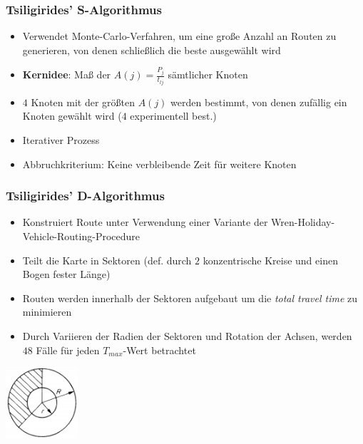 \documentclass{beamer}
\begin{document}
\begin{frame}
  \frametitle{Tsiligirides' S-Algorithmus}
  \begin{itemize}
    \item Verwendet Monte-Carlo-Verfahren, um eine große Anzahl an Routen zu generieren,
    von denen schließlich die beste ausgewählt wird
    \item \textbf{Kernidee}: Maß der  $A(j) = \frac{P_j}{t_{lj}}$ sämtlicher Knoten
    \item $4$ Knoten mit der größten $A(j)$ werden bestimmt, von denen zufällig ein Knoten gewählt wird ($4$ experimentell best.)
    \item Iterativer Prozess
    \item Abbruchkriterium: Keine verbleibende Zeit für weitere Knoten
  \end{itemize}
\end{frame}

\begin{frame}
  \frametitle{Tsiligirides' D-Algorithmus}
  \begin{itemize}
    \item Konstruiert Route unter Verwendung einer Variante der Wren-Holiday-Vehicle-Routing-Procedure
    \item Teilt die Karte in Sektoren (def. durch $2$ konzentrische Kreise und einen Bogen fester Länge)
    \item Routen werden innerhalb der Sektoren aufgebaut um die \textit{total travel time} zu minimieren
    \item Durch Variieren der Radien der Sektoren und Rotation der Achsen, werden $48$ Fälle für jeden $T_{max}$-Wert betrachtet
  \end{itemize}
  \includegraphics[width=0.2\textwidth]{img/d_algo.png}
\end{frame}
\end{document}
